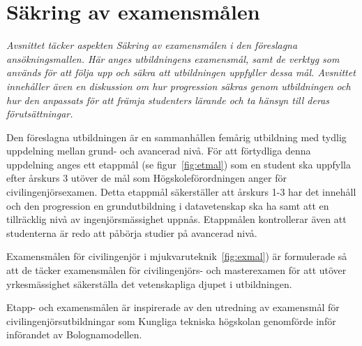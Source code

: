 \chapter{Säkring av examensmålen\label{ch:sakring}}

\begin{tcbdoublebox}
\emph{Avsnittet täcker aspekten Säkring av examensmålen i den föreslagna ansökningsmallen. Här anges utbildningens examensmål, samt de verktyg som används för att följa upp och säkra att utbildningen uppfyller dessa mål. Avsnittet innehåller även en diskussion om hur progression säkras genom utbildningen och hur den anpassats för att främja studenters lärande och ta hänsyn till deras förutsättningar.}
\end{tcbdoublebox}

Den föreslagna utbildningen är en sammanhållen femårig utbildning med tydlig uppdelning mellan grund- och avancerad nivå. För att förtydliga denna uppdelning anges ett etappmål (se figur~\ref{fig:etmal}) som en student ska uppfylla efter årskurs 3 utöver de mål som Högskoleförordningen anger för civilingenjörsexamen. Detta etappmål säkerställer att årskurs 1-3 har det innehåll och den progression en grundutbildning i datavetenskap ska ha samt att en tillräcklig nivå av ingenjörsmässighet uppnås. Etappmålen kontrollerar även att studenterna är redo att påbörja studier på avancerad nivå.

Examensmålen för civilingenjör i mjukvaruteknik~\ref{fig:exmal}) är formulerade så att de täcker examensmålen för civilingenjörs- och masterexamen för att utöver yrkesmässighet säkerställa det vetenskapliga djupet i utbildningen.

Etapp- och examensmålen är inspirerade av den utredning av examensmål för civilingenjörsutbildningar som Kungliga tekniska högskolan genomförde inför införandet av Bolognamodellen.

